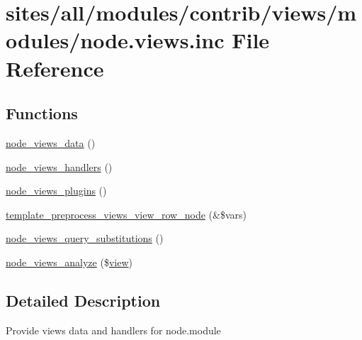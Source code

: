 \hypertarget{node_8views_8inc}{
\section{sites/all/modules/contrib/views/modules/node.views.inc File Reference}
\label{node_8views_8inc}
}
\subsection*{Functions}
\begin{CompactItemize}
\item 
\hyperlink{group__views__node__module_g5e6beb23be547a792dba68f1066d4b9d}{node\_\-views\_\-data} ()
\item 
\hyperlink{group__views__node__module_g601148852d1241238b6d713ca487ca85}{node\_\-views\_\-handlers} ()
\item 
\hyperlink{group__views__node__module_gbad6697258bb04f10bbb73608ab1f52c}{node\_\-views\_\-plugins} ()
\item 
\hyperlink{group__views__node__module_g7ab8a726f775b848f49ada743dae0e58}{template\_\-preprocess\_\-views\_\-view\_\-row\_\-node} (\&\$vars)
\item 
\hyperlink{group__views__node__module_g207da742d80ba74315d7084eeed285b9}{node\_\-views\_\-query\_\-substitutions} ()
\item 
\hyperlink{group__views__node__module_g6060098a01aedf1a74dba4720f806654}{node\_\-views\_\-analyze} (\$\hyperlink{classview}{view})
\end{CompactItemize}


\subsection{Detailed Description}
Provide views data and handlers for node.module 